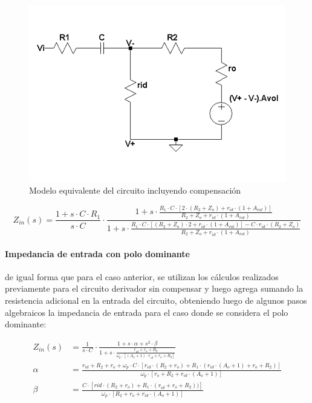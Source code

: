 \begin{figure}[H]
	\centering
	\includegraphics[scale=0.75]{../EJ4/Recursos/Derivador_compensado/Compensado_modelo_impedancia.png}
	\caption{Modelo equivalente del circuito incluyendo compensaci\'on}
	\label{fig:derivador_compensado_modelo}
\end{figure}

\begin{equation}
	Z_{in}(s) = \frac{1 + s \cdot C  \cdot R_1}{s \cdot C} \cdot \frac{1 + s \cdot \frac{R_1 \cdot C \cdot \left[ 2 \cdot (R_2 + Z_o) + r_{id} \cdot(1 + A_{vol}) \right]}{R_2 + Z_o + r_{id} \cdot (1 + A_{vol})}}{1 + s \cdot \frac{R_1 \cdot C \cdot \left[ (R_2 + Z_o) \cdot 2 + r_{id} \cdot ( 1 + A_{vol}) \right] - C \cdot r_{id} \cdot ( R_2 + Z_o)}{R_2 + Z_o + r_{id} \cdot(1+A_{vol})}}
\end{equation}


\paragraph*{Impedancia de entrada con polo dominante} de igual forma que para el caso anterior, se utilizan los c\'alculos realizados previamente para el circuito derivador sin compensar y luego agrega sumando la resistencia adicional en la entrada del circuito, obteniendo luego de algunos pasos algebraicos la impedancia de entrada para el caso donde se considera el polo dominante:

\begin{align*}
	Z_{in}(s) & = \frac{1}{s \cdot C} \cdot \frac{1 + s \cdot \alpha + s^{2} \cdot \beta}{1 + s \cdot \frac{r_{id} + r_{o} + R_2}{\omega_p \cdot \left[ (A_o + 1 ) \cdot r_{id} + r_o + R_2 \right]}} \\
	\alpha & = \frac{r_{id} + R_2 + r_o + \omega_p \cdot C \cdot \left[ r_{id} \cdot ( R_2 + r_o) + R_1 \cdot(r_{id} \cdot ( A_o + 1) + r_o + R_2) \right] }{\omega_p \cdot \left[ r_o + R_2 + r_{id} \cdot (A_o + 1) \right]} \\
	\beta & = \frac{C \cdot \left[ r{id} \cdot ( R_2 + r_o ) + R_1 \cdot (r_{id} + r_o + R_2)) \right]}{\omega_p \cdot \left[ R_2 + r_o + r_{id} \cdot (A_o + 1) \right] }
\end{align*}

